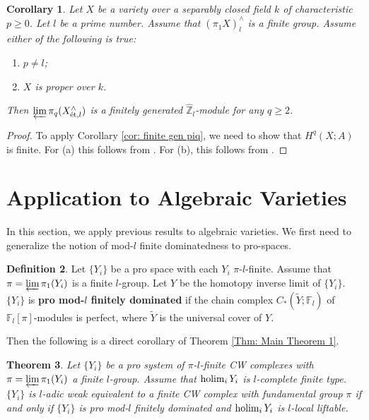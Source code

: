 \documentclass[11pt]{amsart}
\newtheorem{theorem}{Theorem}[section]
\newtheorem{corollary}[theorem]{Corollary}
\theoremstyle{definition}
\newtheorem{definition}[theorem]{Definition}
\numberwithin{equation}{section}
\numberwithin{equation}{section}
\newcommand\ZZ{\mathbb{Z}}
\newcommand\FF{\mathbb{F}}
\DeclareMathOperator{\et}{\acute{e}t}
\def\holim{\qopname\relax m{holim}}
\begin{document}
\begin{corollary}
Let $X$ be a variety over a separably closed field $k$ of characteristic $p\geq 0$. Let $l$ be a prime number. Assume that $(\pi_1^{\et}X)^{\wedge}_l$ is a finite group.
Assume either of the following is true:
\begin{enumerate}
    \item[(a)] $p\neq l$;
    \item[(b)] $X$ is proper over $k$.
\end{enumerate}
Then $\varprojlim\pi_q(X^{\wedge}_{\et,l})$ is a finitely generated $\widehat{\ZZ}_l$-module for any $q\geq 2$.
\end{corollary}
\begin{proof}
To apply Corollary \ref{cor: finite gen piq}, we need to show that $H^q_{\et}(X;A)$ is finite. For (a) this follows from \cite[Th. finitude, Cor. 1.10]{deligne1977sga4.5}.
For (b), this follows from
\cite[VI, Cor. 2.8]{Milne-Etale-cohomology}.
\end{proof}

\section{Application to Algebraic Varieties}

In this section, we apply previous results to algebraic varieties. We first need to generalize the notion of mod-$l$ finite dominatedness to pro-spaces.

\begin{definition}\label{defn: pro mod l finite dom}
Let $\{Y_i\}$ be a pro space with each $Y_i$ $\pi$-$l$-finite. Assume that $\pi=\varprojlim \pi_1(Y_i)$ is a finite $l$-group. Let $Y$ be the homotopy inverse limit of $\{Y_i\}$. $\{Y_i\}$ is \textbf{pro mod-$l$ finitely dominated} if the chain complex $C_*(\widetilde{Y};\FF_l)$ of $\FF_l[\pi]$-modules is perfect, where $\widetilde{Y}$ is the universal cover of $Y$.
\end{definition}


Then the following is a direct corollary of Theorem \ref{Thm: Main Theorem 1}.

\begin{theorem}\label{Thm: Main Theorem 2}
Let $\{Y_i\}$ be a pro system of $\pi$-$l$-finite CW complexes with $\pi=\varprojlim \pi_1(Y_i)$ a finite $l$-group. Assume that $\holim_{i} Y_i$ is $l$-complete finite type. $\{Y_i\}$ is $l$-adic weak equivalent to a finite CW complex with fundamental group $\pi$ if and only if $\{Y_i\}$ is pro mod-$l$ finitely dominated and $\holim_i Y_i$ is $l$-local liftable.    
\end{theorem}
\end{document}
